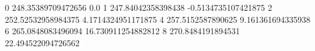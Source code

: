 0 248.35389709472656 0.0
1 247.84042358398438 -0.5134735107421875
2 252.52532958984375 4.1714324951171875
4 257.5152587890625 9.161361694335938
6 265.0848083496094 16.730911254882812
8 270.8484191894531 22.494522094726562
